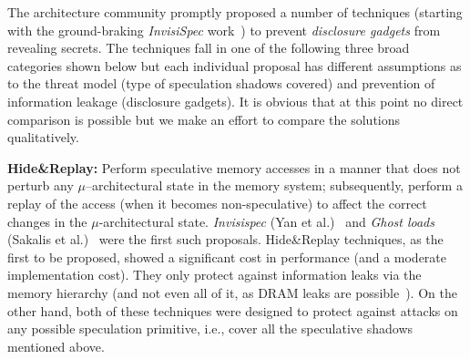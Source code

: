 
The architecture community promptly proposed a number of techniques (starting with the ground-braking \emph{InvisiSpec} work~\cite{yan_invisispec:MICRO2018}) to prevent \emph{disclosure gadgets} from revealing secrets. 
The techniques fall in one of the following three broad categories shown below but each individual proposal has different assumptions as to the threat model (type of speculation shadows covered) and prevention of information leakage (disclosure gadgets). 
It is obvious that at this point no direct comparison is possible but we make an effort to compare the solutions qualitatively.

\textbf{Hide\&Replay:} Perform speculative memory accesses in a manner that does not perturb any $\mu$--architectural state in the memory system;
subsequently, perform a replay of the access (when it becomes non-speculative) to affect the correct changes in the $\mu$-architectural state. \emph{Invisispec} (Yan et al.)~\cite{yan_invisispec:MICRO2018} and \emph{Ghost loads} (Sakalis et al.)~\cite{sakalis+:CF2019ghost} were the first such proposals. 
Hide\&Replay techniques, as the first to be proposed, showed a significant cost in performance (and a moderate implementation cost). They only protect against information leaks via the memory hierarchy (and not even all of it, as DRAM leaks are possible~\cite{pessl2016drama}). On the other hand, both of these techniques were designed to protect against attacks on any possible speculation primitive, i.e., cover all the speculative shadows mentioned above. 

